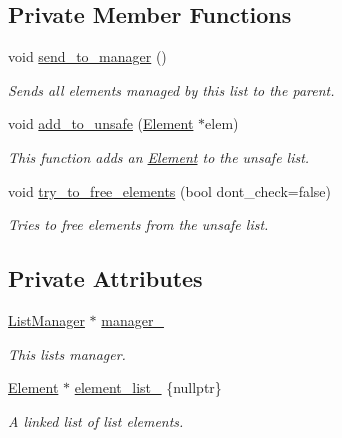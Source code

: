 \subsection*{Private Member Functions}
\begin{DoxyCompactItemize}
\item 
void \hyperlink{classtervel_1_1util_1_1memory_1_1hp_1_1_element_list_adf7724a6cc985cde89f6195bbfd9d656}{send\+\_\+to\+\_\+manager} ()
\begin{DoxyCompactList}\small\item\em Sends all elements managed by this list to the parent. \end{DoxyCompactList}\item 
void \hyperlink{classtervel_1_1util_1_1memory_1_1hp_1_1_element_list_a694cee8f0e74e14e9af680f48f28b109}{add\+\_\+to\+\_\+unsafe} (\hyperlink{classtervel_1_1util_1_1memory_1_1hp_1_1_element}{Element} $\ast$elem)
\begin{DoxyCompactList}\small\item\em This function adds an \hyperlink{classtervel_1_1util_1_1memory_1_1hp_1_1_element}{Element} to the unsafe list. \end{DoxyCompactList}\item 
void \hyperlink{classtervel_1_1util_1_1memory_1_1hp_1_1_element_list_a595805e2257bf2f276ad2e0ecf8dd675}{try\+\_\+to\+\_\+free\+\_\+elements} (bool dont\+\_\+check=false)
\begin{DoxyCompactList}\small\item\em Tries to free elements from the unsafe list. \end{DoxyCompactList}\end{DoxyCompactItemize}
\subsection*{Private Attributes}
\begin{DoxyCompactItemize}
\item 
\hyperlink{classtervel_1_1util_1_1memory_1_1hp_1_1_list_manager}{List\+Manager} $\ast$ \hyperlink{classtervel_1_1util_1_1memory_1_1hp_1_1_element_list_a59a6505303f5914110a624570b5c902d}{manager\+\_\+}
\begin{DoxyCompactList}\small\item\em This list\textquotesingle{}s manager. \end{DoxyCompactList}\item 
\hyperlink{classtervel_1_1util_1_1memory_1_1hp_1_1_element}{Element} $\ast$ \hyperlink{classtervel_1_1util_1_1memory_1_1hp_1_1_element_list_a7522322f344cde24db1524ce4e4666d1}{element\+\_\+list\+\_\+} \{nullptr\}
\begin{DoxyCompactList}\small\item\em A linked list of list elements. \end{DoxyCompactList}\end{DoxyCompactItemize}


